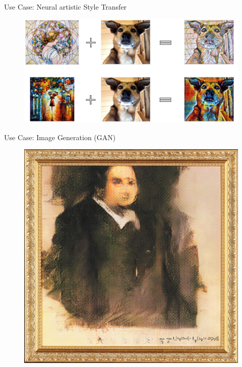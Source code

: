 \begin{frame}{Use Case: Neural artistic Style Transfer}{}
	\begin{figure}
		\centering
		\includegraphics[scale=0.3]{10_deep_learning/02_img/neural_artistic_style_transfer}
	\end{figure}
\end{frame}


\begin{frame}{Use Case: Image Generation (GAN)}{}
	\begin{figure}
		\centering
		\includegraphics[scale=0.25]{10_deep_learning/02_img/image_generation}
	\end{figure}
\end{frame}


